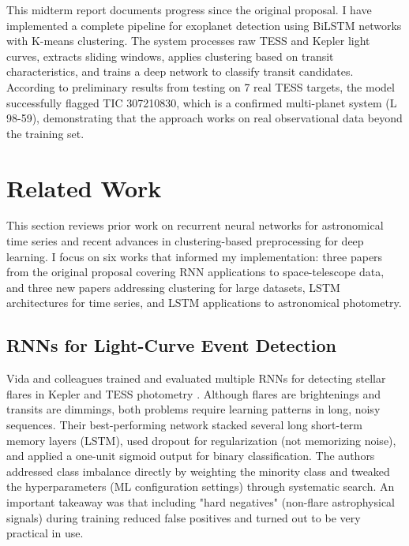 \documentclass[letterpaper]{article}
\begin{document}
This midterm report documents progress since the original proposal. I have implemented a complete pipeline for exoplanet detection using BiLSTM networks with K-means clustering. The system processes raw TESS and Kepler light curves, extracts sliding windows, applies clustering based on transit characteristics, and trains a deep network to classify transit candidates. According to preliminary results from testing on 7 real TESS targets, the model successfully flagged TIC 307210830, which is a confirmed multi-planet system (L 98-59), demonstrating that the approach works on real observational data beyond the training set.

\section{Related Work}

This section reviews prior work on recurrent neural networks for astronomical time series and recent advances in clustering-based preprocessing for deep learning. I focus on six works that informed my implementation: three papers from the original proposal covering RNN applications to space-telescope data, and three new papers addressing clustering for large datasets, LSTM architectures for time series, and LSTM applications to astronomical photometry.

\subsection{RNNs for Light-Curve Event Detection}

Vida and colleagues trained and evaluated multiple RNNs for detecting stellar flares in Kepler and TESS photometry \cite{Vida2021findingflaresrecurrent}. Although flares are brightenings and transits are dimmings, both problems require learning patterns in long, noisy sequences. Their best-performing network stacked several long short-term memory layers (LSTM), used dropout for regularization (not memorizing noise), and applied a one-unit sigmoid output for binary classification. The authors addressed class imbalance directly by weighting the minority class and tweaked the hyperparameters (ML configuration settings) through systematic search. An important takeaway was that including "hard negatives" (non-flare astrophysical signals) during training reduced false positives and turned out to be very practical in use.
\end{document}
